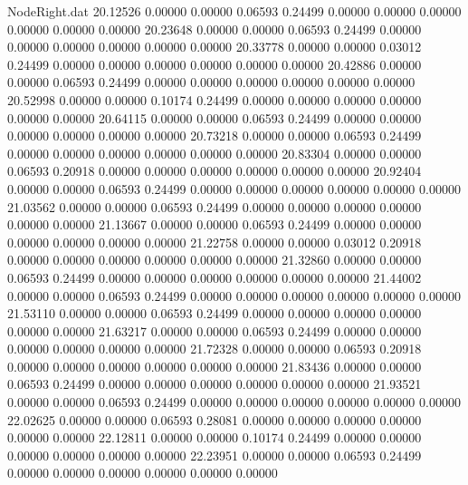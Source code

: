 \begin{filecontents}{NodeRight.dat}
  20.12526    0.00000    0.00000     0.06593    0.24499    0.00000    0.00000    0.00000    0.00000    0.00000    0.00000
  20.23648    0.00000    0.00000     0.06593    0.24499    0.00000    0.00000    0.00000    0.00000    0.00000    0.00000
  20.33778    0.00000    0.00000     0.03012    0.24499    0.00000    0.00000    0.00000    0.00000    0.00000    0.00000
  20.42886    0.00000    0.00000     0.06593    0.24499    0.00000    0.00000    0.00000    0.00000    0.00000    0.00000
  20.52998    0.00000    0.00000     0.10174    0.24499    0.00000    0.00000    0.00000    0.00000    0.00000    0.00000
  20.64115    0.00000    0.00000     0.06593    0.24499    0.00000    0.00000    0.00000    0.00000    0.00000    0.00000
  20.73218    0.00000    0.00000     0.06593    0.24499    0.00000    0.00000    0.00000    0.00000    0.00000    0.00000
  20.83304    0.00000    0.00000     0.06593    0.20918    0.00000    0.00000    0.00000    0.00000    0.00000    0.00000
  20.92404    0.00000    0.00000     0.06593    0.24499    0.00000    0.00000    0.00000    0.00000    0.00000    0.00000
  21.03562    0.00000    0.00000     0.06593    0.24499    0.00000    0.00000    0.00000    0.00000    0.00000    0.00000
  21.13667    0.00000    0.00000     0.06593    0.24499    0.00000    0.00000    0.00000    0.00000    0.00000    0.00000
  21.22758    0.00000    0.00000     0.03012    0.20918    0.00000    0.00000    0.00000    0.00000    0.00000    0.00000
  21.32860    0.00000    0.00000     0.06593    0.24499    0.00000    0.00000    0.00000    0.00000    0.00000    0.00000
  21.44002    0.00000    0.00000     0.06593    0.24499    0.00000    0.00000    0.00000    0.00000    0.00000    0.00000
  21.53110    0.00000    0.00000     0.06593    0.24499    0.00000    0.00000    0.00000    0.00000    0.00000    0.00000
  21.63217    0.00000    0.00000     0.06593    0.24499    0.00000    0.00000    0.00000    0.00000    0.00000    0.00000
  21.72328    0.00000    0.00000     0.06593    0.20918    0.00000    0.00000    0.00000    0.00000    0.00000    0.00000
  21.83436    0.00000    0.00000     0.06593    0.24499    0.00000    0.00000    0.00000    0.00000    0.00000    0.00000
  21.93521    0.00000    0.00000     0.06593    0.24499    0.00000    0.00000    0.00000    0.00000    0.00000    0.00000
  22.02625    0.00000    0.00000     0.06593    0.28081    0.00000    0.00000    0.00000    0.00000    0.00000    0.00000
  22.12811    0.00000    0.00000     0.10174    0.24499    0.00000    0.00000    0.00000    0.00000    0.00000    0.00000
  22.23951    0.00000    0.00000     0.06593    0.24499    0.00000    0.00000    0.00000    0.00000    0.00000    0.00000

\end{filecontents}
